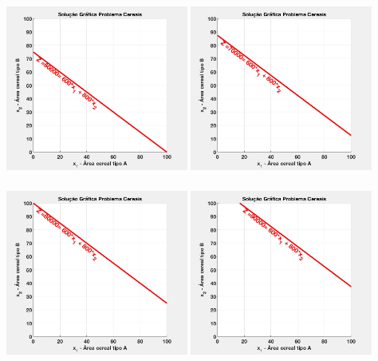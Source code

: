 \documentclass{beamer}
\begin{document}
\begin{frame}
\begin{columns}
\begin{column}{0.5\textwidth}
			\only<3> {\includegraphics[width=6cm,height=6cm]{MatLab/anima_3.png} }
			\only<4> {\includegraphics[width=6cm,height=6cm]{MatLab/anima_4.png} }
			\only<5> {\includegraphics[width=6cm,height=6cm]{MatLab/anima_5.png} }
			\only<6> {\includegraphics[width=6cm,height=6cm]{MatLab/anima_6.png} }

\end{column}
\end{columns}
\end{frame}
\end{document}
